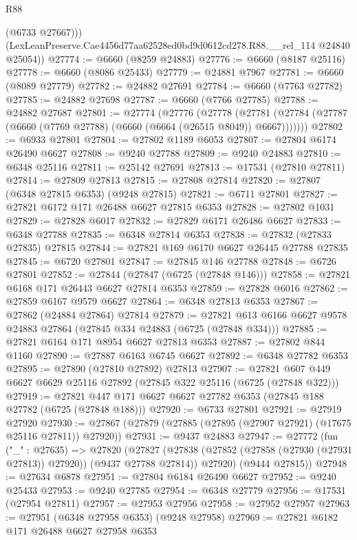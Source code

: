 \begin{lexlean}{R88}
\begin{coremodule}
          (@6733 @27667)))
      (LexLeanPreserve.Cae4456d77aa62528ed0bd9d0612cd278.R88.__rel_114 @24840 @25054))
@27774 := @6660 (@8259 @24883)
@27776 := @6660 (@8187 @25116)
@27778 := @6660 (@8086 @25433)
@27779 := @24881 @7967
@27781 := @6660 (@8089 @27779)
@27782 := @24882 @27691
@27784 := @6660 (@7763 @27782)
@27785 := @24882 @27698
@27787 := @6660 (@7766 @27785)
@27788 := @24882 @27687
@27801 := @27774
    (@27776
      (@27778
        (@27781 (@27784 (@27787 (@6660 (@7769 @27788) (@6660 (@6664 (@26515 @8049)) @6667)))))))
@27802 := @6933 @27801
@27804 := @27802 @1189 @6053
@27807 := @27804 @6174 @26490 @6627
@27808 := @9240 @27788
@27809 := @9240 @24883
@27810 := @6348 @25116
@27811 := @25142 @27691
@27813 := @17531 (@27810 @27811)
@27814 := @27809 @27813
@27815 := @27808 @27814
@27820 := @27807 (@6348 @27815 @6353) (@9248 @27815)
@27821 := @6711 @27801
@27827 := @27821 @6172 @171 @26488 @6627 @27815 @6353
@27828 := @27802 @1031
@27829 := @27828 @6017
@27832 := @27829 @6171 @26486 @6627
@27833 := @6348 @27788
@27835 := @6348 @27814 @6353
@27838 := @27832 (@27833 @27835) @27815
@27844 := @27821 @169 @6170 @6627 @26445 @27788 @27835
@27845 := @6720 @27801
@27847 := @27845 @146 @27788
@27848 := @6726 @27801
@27852 := @27844 (@27847 (@6725 (@27848 @146)))
@27858 := @27821 @6168 @171 @26443 @6627 @27814 @6353
@27859 := @27828 @6016
@27862 := @27859 @6167 @9579 @6627
@27864 := @6348 @27813 @6353
@27867 := @27862 (@24884 @27864) @27814
@27879 := @27821 @613 @6166 @6627 @9578 @24883 @27864 (@27845 @334 @24883 (@6725 (@27848 @334)))
@27885 := @27821 @6164 @171 @8954 @6627 @27813 @6353
@27887 := @27802 @844 @1160
@27890 := @27887 @6163 @6745 @6627
@27892 := @6348 @27782 @6353
@27895 := @27890 (@27810 @27892) @27813
@27907 := @27821 @607 @449 @6627 @6629 @25116 @27892 (@27845 @322 @25116 (@6725 (@27848 @322)))
@27919 := @27821 @447 @171 @6627 @6627 @27782 @6353 (@27845 @188 @27782 (@6725 (@27848 @188)))
@27920 := @6733 @27801
@27921 := @27919 @27920
@27930 := @27867 (@27879 (@27885 (@27895 (@27907 @27921) (@17675 @25116 @27811)) @27920))
@27931 := @9437 @24883
@27947 := @27772
    (fun ("_" : @27635) =>
    @27820
      (@27827
        (@27838 (@27852 (@27858 (@27930 (@27931 @27813)) @27920)) (@9437 @27788 @27814))
        @27920)
      (@9444 @27815))
@27948 := @27634 @6878
@27951 := @27804 @6184 @26490 @6627
@27952 := @9240 @25433
@27953 := @9240 @27785
@27954 := @6348 @27779
@27956 := @17531 (@27954 @27811)
@27957 := @27953 @27956
@27958 := @27952 @27957
@27963 := @27951 (@6348 @27958 @6353) (@9248 @27958)
@27969 := @27821 @6182 @171 @26488 @6627 @27958 @6353

\end{coremodule}
\end{lexlean}
